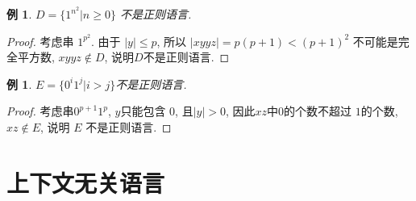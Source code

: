 \documentclass[8pt]{article}
\theoremstyle{compact}
\newtheorem{example}[theorem]{例}
\def\le{\leqslant}
\def\ge{\geqslant}
\begin{document}
\begin{example}
	$D = \{1^{n^2} | n \ge 0\}$ 不是正则语言.
\end{example}
\begin{proof}
	考虑串 $1^{p^2}$. 由于 $|y| \le p$, 所以 $|xyyz| = p(p+1) < (p+1)^2$ 不可能是完全平方数, $xyyz \notin D$, 说明$D$不是正则语言.
\end{proof}
\begin{example}
	$E = \{0^i1^j | i > j\}$不是正则语言. 
\end{example}
\begin{proof}
	考虑串$0^{p+1}1^p$, $y$只能包含 $0$, 且$|y| > 0$, 因此$xz$中$0$的个数不超过 $1$的个数, $xz \notin E$, 说明 $E$ 不是正则语言.
\end{proof}
\newpage
\section{上下文无关语言}
\end{document}

